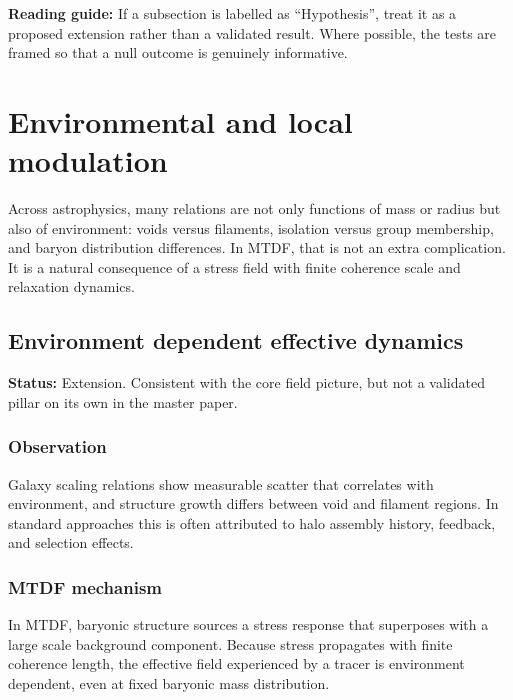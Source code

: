 \documentclass[11pt,a4paper]{article}
\begin{document}
\begin{mdframed}[linecolor=accent,linewidth=0.5pt,backgroundcolor=callout-bg,leftline=true,rightline=true,topline=true,bottomline=true,innerleftmargin=8pt,innerrightmargin=8pt,innertopmargin=6pt,innerbottommargin=6pt]
\textbf{Reading guide:} If a subsection is labelled as ``Hypothesis'', treat it as a proposed extension rather than a validated result. Where possible, the tests are framed so that a null outcome is genuinely informative.
\end{mdframed}

\section{Environmental and local modulation}
\label{sec:env}
Across astrophysics, many relations are not only functions of mass or radius but also of environment: voids versus filaments, isolation versus group membership, and baryon distribution differences. In MTDF, that is not an extra complication. It is a natural consequence of a stress field with finite coherence scale and relaxation dynamics.

\subsection{Environment dependent effective dynamics}
\begin{mdframed}[linecolor=accent,linewidth=0.5pt,backgroundcolor=callout-bg,leftline=true,rightline=true,topline=true,bottomline=true,innerleftmargin=8pt,innerrightmargin=8pt,innertopmargin=6pt,innerbottommargin=6pt]
\textbf{Status:} Extension. Consistent with the core field picture, but not a validated pillar on its own in the master paper.
\end{mdframed}

\subsubsection{Observation}
Galaxy scaling relations show measurable scatter that correlates with environment, and structure growth differs between void and filament regions. In standard approaches this is often attributed to halo assembly history, feedback, and selection effects.

\subsubsection{MTDF mechanism}
In MTDF, baryonic structure sources a stress response that superposes with a large scale background component. Because stress propagates with finite coherence length, the effective field experienced by a tracer is environment dependent, even at fixed baryonic mass distribution.
\end{document}
